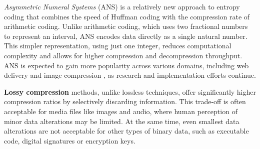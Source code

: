 



\emph{Asymmetric Numeral Systems} \cite{duda2009asymmetricnumeralsystems,duda2014asymmetricnumeralsystemsentropy} (ANS) is a relatively new approach to entropy coding that combines the speed of Huffman coding with the compression rate of arithmetic coding. Unlike arithmetic coding, which uses two fractional numbers to represent an interval, ANS encodes data directly as a single natural number. This simpler representation, using just one integer, reduces computational complexity and allows for higher compression and decompression throughput. ANS is expected \cite{duda2015use} to gain more popularity across various domains, including web delivery and image compression \cite{hsieh2022review}, as research \cite{collet2021rfc-zstandard} and implementation efforts continue.






\textbf{Lossy compression} methods, unlike lossless techniques, offer significantly higher compression ratios \cite{salomon1998data-compression} by selectively discarding information. This trade-off is often acceptable for media files like images and audio, where human perception of minor data alterations may be limited. At the same time, even smallest data alterations are not acceptable for other types of binary data, such as executable code, digital signatures or encryption keys.

